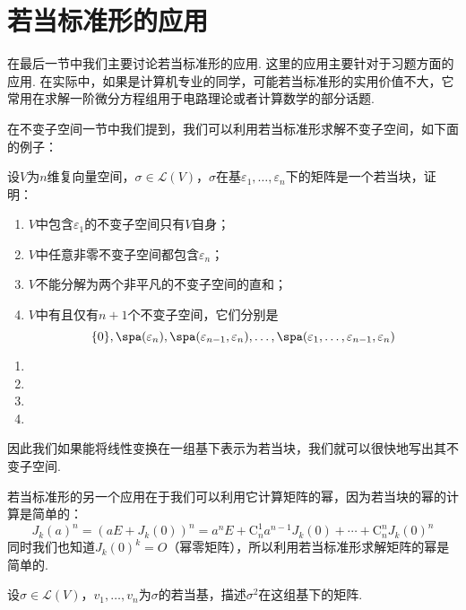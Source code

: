 \section{若当标准形的应用}

在最后一节中我们主要讨论若当标准形的应用. 这里的应用主要针对于习题方面的应用. 在实际中，如果是计算机专业的同学，可能若当标准形的实用价值不大，它常用在求解一阶微分方程组用于电路理论或者计算数学的部分话题.

在不变子空间一节中我们提到，我们可以利用若当标准形求解不变子空间，如下面的例子：
\begin{example}
    设$V$为$n$维复向量空间，$\sigma\in \mathcal{L}(V)$，$\sigma$在基$\varepsilon_1,\ldots,\varepsilon_n$下的矩阵是一个若当块，证明：
    \begin{enumerate}
        \item $V$中包含$\varepsilon_1$的不变子空间只有$V$自身；

        \item $V$中任意非零不变子空间都包含$\varepsilon_n$；

        \item $V$不能分解为两个非平凡的不变子空间的直和；

        \item $V$中有且仅有$n+1$个不变子空间，它们分别是
              \[\{0\},\spa(\varepsilon_n),\spa(\varepsilon_{n-1},\varepsilon_n),\ldots,\spa(\varepsilon_1,\ldots,\varepsilon_{n-1},\varepsilon_n)\]
    \end{enumerate}
\end{example}

\begin{solution}
    \begin{enumerate}
        \item

        \item

        \item

        \item
    \end{enumerate}
\end{solution}

因此我们如果能将线性变换在一组基下表示为若当块，我们就可以很快地写出其不变子空间.

若当标准形的另一个应用在于我们可以利用它计算矩阵的幂，因为若当块的幂的计算是简单的：
\[J_k(a)^n=(aE+J_k(0))^n=a^nE+\mathrm{C}_n^1a^{n-1}J_k(0)+\cdots+\mathrm{C}_n^nJ_k(0)^n\]
同时我们也知道$J_k(0)^k=O$（幂零矩阵），所以利用若当标准形求解矩阵的幂是简单的.
\begin{example}
    设$\sigma\in \mathcal{L}(V)$，$v_1,\ldots,v_n$为$\sigma$的若当基，描述$\sigma^2$在这组基下的矩阵.
\end{example}

